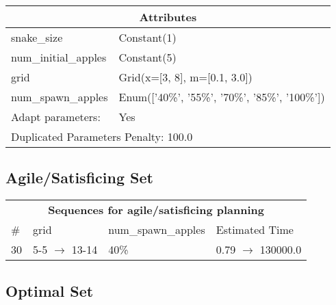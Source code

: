 \documentclass{article}
\begin{document}
                    \begin{center}
                    \begin{tabular}{p{}p{}}
                    \multicolumn{2}{c}{\bf \large Attributes}\\\midrule
                    snake\_size & Constant(1)\\
num\_initial\_apples & Constant(5)\\
grid & Grid(x=[3, 8], m=[0.1, 3.0])\\
num\_spawn\_apples & Enum(['40\%', '55\%', '70\%', '85\%', '100\%'])
                    
                    \\\midrule
                    Adapt parameters: & Yes  
                
                     \\\midrule
                    \multicolumn{2}{l}{Duplicated Parameters Penalty: 100.0}
                    \end{tabular}
                    \end{center}
                
                         \subsection*{Agile/Satisficing Set}

                        \begin{center}
                        \begin{tabular}{l|l|l|l}
                        \multicolumn{4}{c}{\bf \large Sequences for agile/satisficing planning}\\
                        \# & grid & num\_spawn\_apples & Estimated Time\\\midrule
                        30&5-5 $\rightarrow$ 13-14&40\%&0.79 $\rightarrow$ 130000.0
                        \end{tabular}
                        \end{center}
                    
                            \subsection*{Optimal Set}
\end{document}
